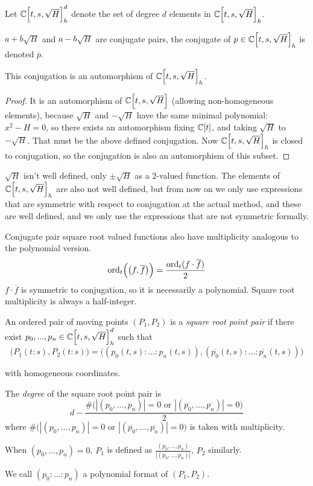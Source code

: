 \documentclass[a4paper]{article}
\newcommand{\ord}{\operatorname{ord}}
\begin{document}
Let $\mathbb{C}\Bigl[t,s,\sqrt{H}\Bigr]_h^d$ denote the set of degree $d$ elements in $\mathbb{C}\Bigl[t,s,\sqrt{H}\Bigr]_h$.



\begin{definition}
    $a+b\sqrt{H}$ and $a-b\sqrt{H}$ are conjugate pairs, the conjugate of $p \in \mathbb{C}\Bigl[t,s,\sqrt{H}\Bigr]_h$ is denoted $\overline{p}$.
\end{definition}
\begin{lemma}
    This conjugation is an automorphism of $\mathbb{C}\Bigl[t,s,\sqrt{H}\Bigr]_h$.
\end{lemma}
\begin{proof}
    It is an automorphism of $\mathbb{C}\Bigl[t,s,\sqrt{H}\Bigr]$ (allowing non-homogeneous elements), because $\sqrt{H}$ and $-\sqrt{H}$ have the same minimal polynomial: $x^2-H=0$, so there exists an automorphism fixing $\mathbb{C}[t]$, and taking $\sqrt{H}$ to $-\sqrt{H}$. That must be the above defined conjugation.
    Now $\mathbb{C}\Bigl[t,s,\sqrt{H}\Bigr]_h$ is closed to conjugation, so the conjugation is also an automorphism of this subset.
\end{proof}

\begin{remark}
    $\sqrt{H}$ isn't well defined, only $\pm \sqrt{H}$ as a 2-valued function. The elements of $\mathbb{C}\Bigl[t,s,\sqrt{H}\Bigr]_h$ are also not well defined, but from now on we only use expressions that are symmetric with respect to conjugation at the actual method, and these are well defined, and we only use the expressions that are not symmetric formally.
\end{remark}


Conjugate pair square root valued functions also have multiplicity analogous to the polynomial version.
$$\ord_t\Bigl(\left(f,\overline{f}\right)\Bigr)=\frac{\ord_t(f\cdot \overline{f})}{2}$$
$f\cdot\overline{f}$ is symmetric to conjugation, so it is necessarily a polynomial.
Square root multiplicity is always a half-integer.


\begin{definition}

    An ordered pair of moving points $(P_1, P_2)$ is a \textit{square root point pair} if there exist $p_0,...,p_n \in \mathbb{C}\Bigl[t,s,\sqrt{H}\Bigr]_h^d$ such that $$\big(P_1(t:s), P_2(t:s)\big)=\big((p_0(t,s):\ldots:p_n(t,s)), (\overline{p_0}(t,s):\ldots:\overline{p_n}(t,s))\big)$$

    with homogeneous coordinates.

    The \textit{degree} of the square root point pair is
    $$d-\frac{\#\bigl(|(p_0,\ldots,p_n)|=0\text{ or } |(\overline{p_0},\ldots,\overline{p_n})|=0\bigr)}{2}$$
    where $\#\bigl(|(p_0,\ldots,p_n)|=0\text{ or } |(\overline{p_0},\ldots,\overline{p_n})|=0\bigr)$ is taken with multiplicity.

    When $(p_0,\ldots,p_n)=0$, $P_1$ is defined as $\frac{(p_0,\ldots,p_n)}{|(p_0,\ldots,p_n)|}$, $P_2$ similarly.

    We call $(p_0:\ldots:p_n)$ a polynomial format of $(P_1, P_2)$.
\end{definition}
\end{document}
